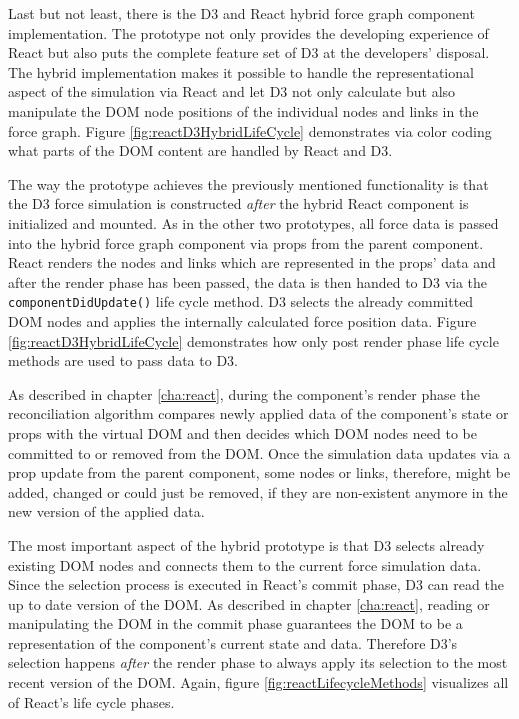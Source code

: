 Last but not least, there is the D3 and React hybrid force graph component implementation. The prototype not only provides the developing experience of React but also puts the complete feature set of D3 at the developers' disposal. The hybrid implementation makes it possible to handle the representational aspect of the simulation via React and let D3 not only calculate but also manipulate the DOM node positions of the individual nodes and links in the force graph. Figure \ref{fig:reactD3HybridLifeCycle} demonstrates via color coding what parts of the DOM content are handled by React and D3. 

The way the prototype achieves the previously mentioned functionality is that the D3 force simulation is constructed \emph{after} the hybrid React component is initialized and mounted. As in the other two prototypes, all force data is passed into the hybrid force graph component via props from the parent component. React renders the nodes and links which are represented in the props' data and after the render phase has been passed, the data is then handed to D3 via the \texttt{componentDidUpdate()} life cycle method. D3 selects the already committed DOM nodes and applies the internally calculated force position data. Figure \ref{fig:reactD3HybridLifeCycle} demonstrates how only post render phase life cycle methods are used to pass data to D3.

As described in chapter \ref{cha:react}, during the component's render phase the reconciliation algorithm compares newly applied data of the component's state or props with the virtual DOM and then decides which DOM nodes need to be committed to or removed from the DOM. Once the simulation data updates via a prop update from the parent component, some nodes or links, therefore, might be added, changed or could just be removed, if they are non-existent anymore in the new version of the applied data.

The most important aspect of the hybrid prototype is that D3 selects already existing DOM nodes and connects them to the current force simulation data. Since the selection process is executed in React's commit phase, D3 can read the up to date version of the DOM. As described in chapter \ref{cha:react}, reading or manipulating the DOM in the commit phase guarantees the DOM to be a representation of the component's current state and data. Therefore D3's selection happens \emph{after} the render phase to always apply its selection to the most recent version of the DOM. Again, figure \ref{fig:reactLifecycleMethods} visualizes all of React's life cycle phases.


